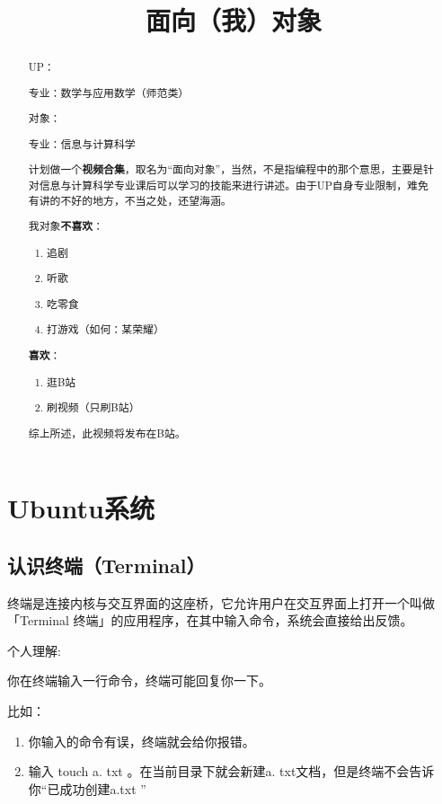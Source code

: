 \documentclass[12pt]{article}
\title{面向（我）对象}  %
\begin{document}
\begin{abstract}
UP：

专业：数学与应用数学（师范类）


对象：

专业：信息与计算科学

计划做一个\textbf{视频合集}，取名为“面向对象”，当然，不是指编程中的那个意思，主要是针对信息与计算科学专业课后可以学习的技能来进行讲述。由于UP自身专业限制，难免有讲的不好的地方，不当之处，还望海涵。

\noindent 我对象\textbf{不喜欢}：
\begin{enumerate}
    \item 追剧
    \item 听歌
    \item 吃零食
    \item 打游戏（如何：某荣耀）
\end{enumerate}

\noindent \textbf{喜欢}：

\begin{enumerate}
    \item 逛B站
    \item 刷视频（只刷B站）
\end{enumerate}

综上所述，此视频将发布在B站。
\end{abstract}

\maketitle  
\tableofcontents  

\section{Ubuntu系统}

\subsection{认识终端（Terminal）}

终端是连接内核与交互界面的这座桥，它允许用户在交互界面上打开一个叫做「Terminal 终端」的应用程序，在其中输入命令，系统会直接给出反馈。

个人理解:

你在终端输入一行命令，终端可能回复你一下。

\noindent 比如：

\begin{enumerate}
    \item 你输入的命令有误，终端就会给你报错。

    \item 输入 touch a\(.\) txt 
    。在当前目录下就会新建a\(.\) txt文档，但是终端不会告诉你“已成功创建a\(.\)txt ”
\end{enumerate}
\end{document}
